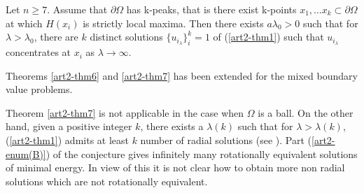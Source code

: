 \begin{theorem}\label{art2-thm7}
Let $n\geq 7$. Assume that $\partial \Omega$ has k-peaks, that is there exist k-points ${x_{1}, \ldots x_{k}} \subset \partial\Omega$ at which $H(x_{i})$ is strictly local maxima. Then there exists $a \lambda_{0} > 0$ such that for $\lambda > \lambda_{0}$, there are $k$ distinct solutions $\{u_{i_{\lambda}}\}_{i}^{k} = 1$ of (\ref{art2-thm1}) such that $u_{i_{\lambda}}$ concentrates at $x_{i}$ as $\lambda \rightarrow \infty$.
\end{theorem}
Theorems \ref{art2-thm6} and \ref{art2-thm7} has been extended for the mixed boundary value problems.

Theorem \ref{art2-thm7} is not applicable in the case when $\Omega$ is a ball. On the other hand, given a positive integer $k$, there exists a $\lambda(k)$ such that for $\lambda > \lambda(k)$, (\ref{art2-thm1}) admits at least $k$ number of radial solutions (see \cite{art2-key18}). Part (\ref{art2-enum(B)}) of the conjecture gives infinitely many rotationally equivalent solutions of minimal energy. In view of this it is not clear how to obtain more non radial solutions which are not rotationally equivalent. 
 
